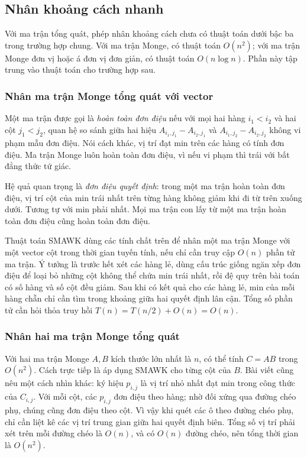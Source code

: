 \documentclass[11pt]{article}
\begin{document}
\subsection{Nhân khoảng cách nhanh}

Với ma trận tổng quát, phép nhân khoảng cách chưa có thuật toán dưới bậc ba
trong trường hợp chung. Với ma trận Monge, có thuật toán $O(n^2)$; với ma trận
Monge đơn vị hoặc á đơn vị đơn giản, có thuật toán $O(n\log n)$. Phần này tập
trung vào thuật toán cho trường hợp sau.

\subsubsection{Nhân ma trận Monge tổng quát với vector}

Một ma trận được gọi là \emph{hoàn toàn đơn điệu} nếu với mọi hai hàng
$i_1<i_2$ và hai cột $j_1<j_2$, quan hệ so sánh giữa hai hiệu
$A_{i_1,j_1}-A_{i_2,j_1}$ và $A_{i_1,j_2}-A_{i_2,j_2}$ không vi phạm mẫu đơn
điệu. Nói cách khác, vị trí đạt min trên các hàng có tính đơn điệu. Ma trận
Monge luôn hoàn toàn đơn điệu, vì nếu vi phạm thì trái với bất đẳng thức tứ
giác.

Hệ quả quan trọng là \emph{đơn điệu quyết định}: trong một ma trận hoàn toàn
đơn điệu, vị trí cột của min trái nhất trên từng hàng không giảm khi đi từ trên
xuống dưới. Tương tự với min phải nhất. Mọi ma trận con lấy từ một ma trận hoàn
toàn đơn điệu cũng hoàn toàn đơn điệu.

Thuật toán SMAWK dùng các tính chất trên để nhân một ma trận Monge với một
vector cột trong thời gian tuyến tính, nếu chỉ cần truy cập $O(n)$ phần tử ma
trận. Ý tưởng là trước hết xét các hàng lẻ, dùng cấu trúc giống ngăn xếp đơn
điệu để loại bỏ những cột không thể chứa min trái nhất, rồi đệ quy trên bài
toán có số hàng và số cột đều giảm. Sau khi có kết quả cho các hàng lẻ, min
của mỗi hàng chẵn chỉ cần tìm trong khoảng giữa hai quyết định lân cận. Tổng
số phần tử cần hỏi thỏa truy hồi $T(n)=T(n/2)+O(n)=O(n)$.

\subsubsection{Nhân hai ma trận Monge tổng quát}

Với hai ma trận Monge $A,B$ kích thước lớn nhất là $n$, có thể tính
$C=AB$ trong $O(n^2)$. Cách trực tiếp là áp dụng SMAWK cho từng cột của $B$.
Bài viết cũng nêu một cách nhìn khác: ký hiệu $p_{i,j}$ là vị trí nhỏ nhất đạt
min trong công thức của $C_{i,j}$. Với mỗi cột, các $p_{i,j}$ đơn điệu theo
hàng; nhờ đối xứng qua đường chéo phụ, chúng cũng đơn điệu theo cột. Vì vậy
khi quét các ô theo đường chéo phụ, chỉ cần liệt kê các vị trí trung gian giữa
hai quyết định biên. Tổng số vị trí phải xét trên mỗi đường chéo là $O(n)$,
và có $O(n)$ đường chéo, nên tổng thời gian là $O(n^2)$.
\end{document}
